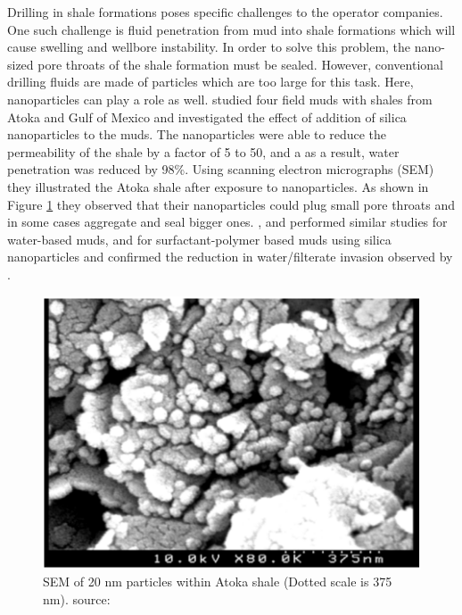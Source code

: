 Drilling in shale formations  poses specific challenges to the operator companies. One such challenge is fluid penetration from mud into shale formations which will cause swelling and wellbore instability. In order to solve this problem, the nano-sized pore throats  of the shale formation must be sealed. However, conventional drilling fluids are made of particles which are too large for this task. Here, nanoparticles can play a role as well. \citet{Sensoy2009} studied four field muds with shales from Atoka and Gulf of Mexico and investigated the effect of addition of silica nanoparticles to the muds. The nanoparticles were able to reduce the permeability of the shale by a factor of 5 to 50, and a as a result, water penetration was reduced by 98\%. Using scanning electron micrographs (SEM) they illustrated the Atoka shale after exposure to nanoparticles. As shown in Figure \ref{fig:npShale} they observed that their nanoparticles could plug small pore throats and in some cases aggregate and seal bigger ones. \citet{Cai2012}, \citet{Riley2012} and \citet{Young2013} performed similar studies for water-based muds, and \citet{Srivatsa2011} for surfactant-polymer based muds using silica nanoparticles and confirmed the reduction in water/filterate invasion observed by \citet{Sensoy2009}.

\begin{figure}[h]
    \centering
    \includegraphics[width=\textwidth]{img/fig/npShale.png}
    \caption{SEM of 20 nm particles within Atoka shale (Dotted scale is 375 nm). source: \citet{Sensoy2009}}
    \label{fig:npShale}
\end{figure}

